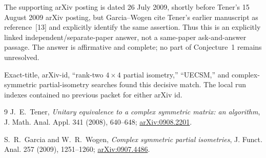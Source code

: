 \documentclass[10pt]{article}
\begin{document}
The supporting arXiv posting is dated 26 July 2009, shortly before Tener's
15 August 2009 arXiv posting, but Garcia--Wogen cite Tener's earlier manuscript
as reference~[13] and explicitly identify the same assertion.  Thus this is
an explicitly linked independent/separate-paper answer, not a same-paper
ask-and-answer passage.  The answer is affirmative and complete; no part of
Conjecture~1 remains unresolved.

Exact-title, arXiv-id, ``rank-two $4\times4$ partial isometry,'' ``UECSM,''
and complex-symmetric partial-isometry searches found this decisive match.
The local run indexes contained no previous packet for either arXiv id.

\begin{thebibliography}{9}
J.~E.~Tener,
\emph{Unitary equivalence to a complex symmetric matrix: an algorithm},
J. Math. Anal. Appl. 341 (2008), 640--648;
\href{https://arxiv.org/abs/0908.2201}{arXiv:0908.2201}.

S.~R.~Garcia and W.~R.~Wogen,
\emph{Complex symmetric partial isometries},
J. Funct. Anal. 257 (2009), 1251--1260;
\href{https://arxiv.org/abs/0907.4486}{arXiv:0907.4486}.
\end{thebibliography}
\end{document}
